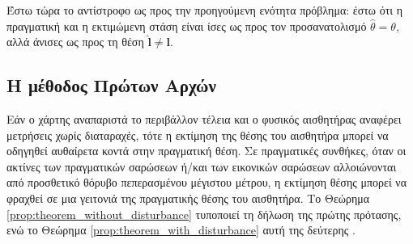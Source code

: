 Έστω τώρα το αντίστροφο ως προς την προηγούμενη ενότητα πρόβλημα:
έστω ότι η πραγματική και η εκτιμώμενη στάση είναι ίσες ως προς τον
προσανατολισμό $\hat{\theta} = \theta$, αλλά άνισες ως προς τη θέση
$\hat{\bm{l}} \neq \bm{l}$.

\subsection{Η μέθοδος Πρώτων Αρχών}
\label{subsection:02_04_03:01}

Εάν ο χάρτης αναπαριστά το περιβάλλον τέλεια και ο φυσικός αισθητήρας αναφέρει
μετρήσεις χωρίς διαταραχές, τότε η εκτίμηση της θέσης του αισθητήρα μπορεί να
οδηγηθεί αυθαίρετα κοντά στην πραγματική θέση. Σε πραγματικές συνθήκες, όταν οι
ακτίνες των πραγματικών σαρώσεων ή/και των εικονικών σαρώσεων αλλοιώνονται από
προσθετικό θόρυβο πεπερασμένου μέγιστου μέτρου, η εκτίμηση θέσης μπορεί να
φραχθεί σε μια γειτονιά της πραγματικής θέσης του αισθητήρα. Το Θεώρημα
\ref{prop:theorem_without_disturbance} τυποποιεί τη δήλωση της πρώτης πρότασης,
ενώ το Θεώρημα \ref{prop:theorem_with_disturbance} αυτή της δεύτερης
\cite{Filotheou2022d}.

